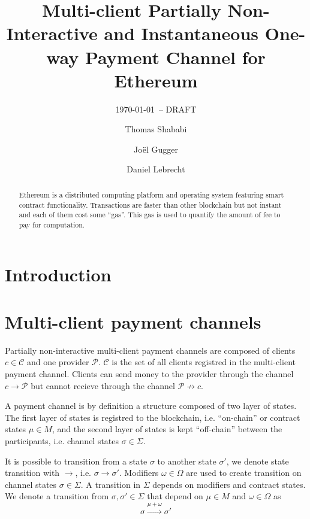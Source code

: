 \documentclass{llncs}
\begin{document}
\title{Multi-client Partially Non-Interactive and Instantaneous One-way Payment Channel for Ethereum}
\author{Thomas Shababi \and Jo\"el Gugger \and Daniel Lebrecht}

\subtitle{{\normalsize\today{\small\ -- DRAFT}}}

\maketitle

\begin{abstract} Ethereum is a distributed computing platform and operating system featuring smart contract functionality. Transactions are faster than other blockchain but not instant and each of them cost some ``gas''. This gas is used to quantify the amount of fee to pay for computation. 
\end{abstract}

\section{Introduction} 

\section{Multi-client payment channels} Partially non-interactive multi-client payment channels are composed of clients $c \in \mathcal{C}$ and one provider $\mathcal{P}$. $\mathcal{C}$ is the set of all clients registred in the multi-client payment channel. Clients can send money to the provider through the channel $c \rightarrow \mathcal{P}$ but cannot recieve through the channel $\mathcal{P} \not\rightarrow c$.

A payment channel is by definition a structure composed of two layer of states. The first layer of states is registred to the blockchain, i.e. ``on-chain'' or contract states $\mu \in M$, and the second layer of states is kept ``off-chain'' between the participants, i.e. channel states $\sigma \in \Sigma$.

It is possible to transition from a state $\sigma$ to another state $\sigma'$, we denote state transition with $\rightarrow$, i.e. $\sigma \rightarrow \sigma'$.  Modifiers $\omega \in \Omega$ are used to create transition on channel states $\sigma \in \Sigma$. A transition in $\Sigma$ depends on modifiers and contract states. We denote a transition from $\sigma, \sigma' \in \Sigma$ that depend on $\mu \in M$ and $\omega \in \Omega$ as
$$\sigma \xrightarrow{\mu+\omega} \sigma'$$
\end{document}
